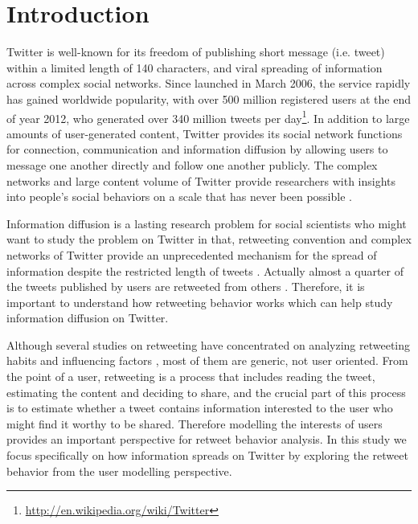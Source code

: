 \documentclass{acm_proc_article-sp}
\begin{document}
\section{Introduction}
\label{introduction}
Twitter is well-known for its freedom of publishing short message (i.e. tweet) within a limited length of 140 characters, and viral spreading of information across complex social networks.
Since launched in March 2006, the service rapidly has gained worldwide popularity, with over 500 million registered users at the end of year 2012, who generated over 340 million tweets per day\footnote{\url{http://en.wikipedia.org/wiki/Twitter}}.
In addition to large amounts of user-generated content, Twitter provides its social network functions for connection, communication and information diffusion by allowing users to message one another directly and follow one another publicly. 
The complex networks and large content volume of Twitter provide researchers with insights into people’s social behaviors on a scale that has never been possible \cite{DBLP:conf/hicss/StieglitzD12}.

Information diffusion is a lasting research problem for social scientists who might want to study the problem on Twitter in that, retweeting convention and complex networks of Twitter provide an unprecedented mechanism for the spread of information despite the restricted length of tweets \cite{Jenders:2013APV}. 
Actually almost a quarter of the tweets published by users are retweeted from others \cite{conf/cikm/YangGCTLZS10}. 
Therefore, it is important to understand how retweeting behavior works which can help study information diffusion on Twitter. 

Although several studies on retweeting have concentrated on analyzing retweeting habits and influencing factors \cite{Boyd2010,Kwak:2010TSN,Suh2010}, most of them are generic, not user oriented.
From the point of a user, retweeting is a process that includes reading the tweet, estimating the content and deciding to share, and the crucial part of this process is to estimate whether a tweet contains information interested to the user who might find it worthy to be shared.
Therefore modelling the interests of users provides an important perspective for retweet behavior analysis. 
In this study we focus specifically on how information spreads on Twitter by exploring the retweet behavior from the user modelling perspective.
\end{document}
